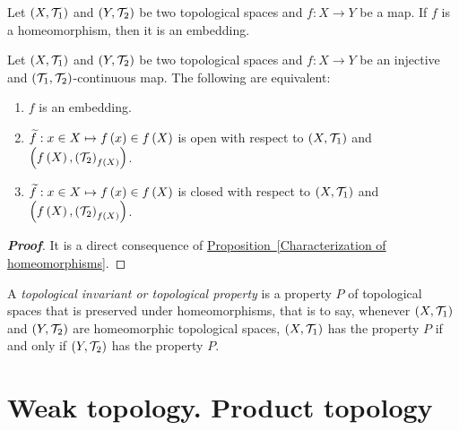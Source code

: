 \begin{remark}
  Let $\left(X,\mathcal{T}_1\right)$ and $\left(Y,\mathcal{T}_2\right)$ be two topological spaces and $f:X\rightarrow Y$ be a map. If $f$ is a homeomorphism, then it is an embedding.
\end{remark}

\begin{corollary}
  Let $\left(X,\mathcal{T}_1\right)$ and $\left(Y,\mathcal{T}_2\right)$ be two topological spaces and $f:X\rightarrow Y$ be an injective and $\left(\mathcal{T}_1,\mathcal{T}_2\right)$-continuous map. The following are equivalent:

  \begin{enumerate}
    \item $f$ is an embedding.
    \item $\widetilde{f}:x\in X\mapsto f\left(x\right)\in f\left(X\right)$ is open with respect to $\left(X,\mathcal{T}_1\right)$ and $\left(f\left(X\right),\left(\mathcal{T}_2\right)_{f\left(X\right)}\right)$.
    \item $\widetilde{f}:x\in X\mapsto f\left(x\right)\in f\left(X\right)$ is closed with respect to $\left(X,\mathcal{T}_1\right)$ and $\left(f\left(X\right),\left(\mathcal{T}_2\right)_{f\left(X\right)}\right)$.
  \end{enumerate}
  \begin{proof}[\rm\textbf{Proof}]
    It is a direct consequence of \hyperref[Characterization of homeomorphisms]{Proposition~\ref*{Characterization of homeomorphisms}}.
  \end{proof}
\end{corollary}

\begin{definition}
  A \textit{topological invariant or topological property} is a property $P$ of topological spaces that is preserved under homeomorphisms, that is to say, whenever $\left(X,\mathcal{T}_1\right)$ and $\left(Y,\mathcal{T}_2\right)$ are homeomorphic topological spaces, $\left(X,\mathcal{T}_1\right)$ has the property $P$ if and only if $\left(Y,\mathcal{T}_2\right)$ has the property $P$.
\end{definition}

\section{Weak topology. Product topology}


